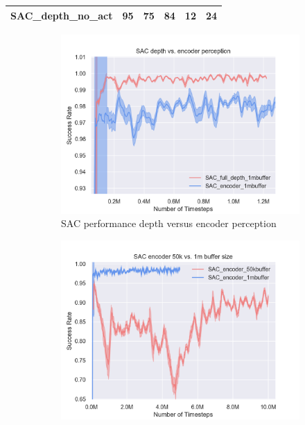 \begin{table}[]
\begin{tabular}{l|l|l|l|l|l|}
    \multicolumn{1}{|l|}{\textbf{SAC\_depth\_no\_act}}  & 95                                                                                          & 75                                                                                         & 84                                                                                          & 12                                                                                                       & 24                                                                                         \\ \hline
    \end{tabular}
\end{table}

\begin{figure}[!htbp]
    \begin{subfigure}{0.49\textwidth}
        \includegraphics[width=\linewidth]{figures/SACfull/SAC_depth_vs_encoder_perception.png}
        \caption{SAC performance depth versus encoder perception} \label{fig:percep}
    \end{subfigure}%
    \hspace*{\fill}   %
    \begin{subfigure}{0.49\textwidth}
        \includegraphics[width=\linewidth]{figures/SACfull/SAC_encoder_50k_vs_1m_buffer_size}

\end{subfigure}
\end{figure}
